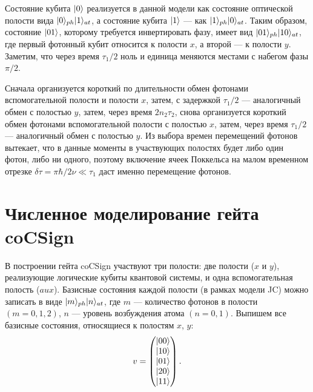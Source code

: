 \begin{figure}[h!]
	\noindent{}
\end{figure}

Состояние кубита $|0\rangle$ реализуется в данной модели как состояние оптической полости вида $|0\rangle_{ph}|1\rangle_{at}$, а состояние кубита $|1\rangle$ --- как $|1\rangle_{ph}|0\rangle_{at}$. Таким образом, состояние $|01\rangle$, которому требуется инвертировать фазу, имеет вид $|01\rangle_{ph}|10\rangle_{at}$, где первый фотонный кубит относится к полости $x$, а второй --- к полости $y$. Заметим, что через время $\tau_{1}/2$ ноль и единица меняются местами с набегом фазы $\pi/2$.

Сначала организуется короткий по длительности обмен фотонами вспомогательной полости и полости $x$, затем, с задержкой $\tau_{1}/2$ --- аналогичный обмен с полостью $y$, затем, через время $2n_{2}\tau_{2}$, снова организуется короткий обмен фотонами вспомогательной полости с полостью $x$, затем, через время $\tau_{1}/2$ --- аналогичный обмен с полостью $y$. Из выбора времен перемещений фотонов вытекает, что в данные моменты в участвующих полостях будет либо один фотон, либо ни одного, поэтому включение ячеек Поккельса на малом временном отрезке $\delta\tau = \pi\hbar/2\nu \ll \tau_{1}$ даст именно перемещение фотонов.

\section{Численное моделирование гейта coCSign}

В построении гейта coCSign участвуют три полости: две полости ($x$ и $y$), реализующие логические кубиты квантовой системы, и одна вспомогательная полость ($aux$). Базисные состояния каждой полости (в рамках модели JC) можно записать в виде $|m\rangle_{ph}|n\rangle_{at}$, где $m$ --- количество фотонов в полости $(m = 0, 1, 2)$, $n$ --- уровень возбуждения атома $(n = 0, 1)$. Выпишем все базисные состояния, относящиеся к полостям $x$, $y$:
\[
v = \begin{pmatrix} 
|00\rangle \\ 
|10\rangle \\ 
|01\rangle \\ 
|20\rangle \\ 
|11\rangle
\end{pmatrix}.
\]

